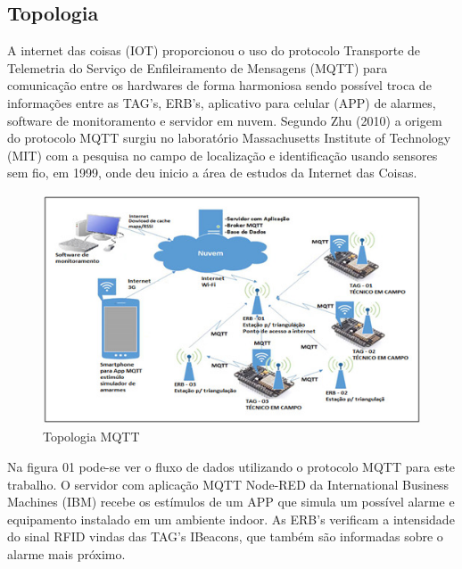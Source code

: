\documentclass[
	article,			%
	12pt,				%
	oneside,			%
	a4paper,			%
	english,			%
	brazil,				%
	sumario=tradicional
	]{abntex2}
\begin{document}
\subsection{Topologia}
A internet das coisas (IOT) proporcionou o uso do protocolo Transporte de Telemetria do Serviço de Enfileiramento de Mensagens (MQTT) para comunicação entre os hardwares de forma harmoniosa sendo possível troca de informações entre as TAG’s, ERB’s, aplicativo para celular (APP) de alarmes, software de monitoramento e servidor em nuvem. 
Segundo Zhu (2010) a origem do protocolo MQTT surgiu no laboratório Massachusetts Institute of Technology (MIT) com a pesquisa no campo de localização e identificação usando sensores sem fio, em 1999, onde deu inicio a área de estudos da Internet das Coisas.
\begin{figure}[H]
	\begin{center}
		\caption{Topologia MQTT}
		\includegraphics{image1}
	\end{center}
\end{figure}
Na figura 01 pode-se ver o fluxo de dados utilizando o protocolo MQTT para este trabalho.
O servidor com aplicação MQTT Node-RED da International Business Machines (IBM) recebe os estímulos de um APP que simula um possível alarme e equipamento instalado em um ambiente indoor. As ERB’s verificam a intensidade do sinal RFID vindas das TAG’s IBeacons, que também são informadas sobre o alarme mais próximo.
\end{document}
